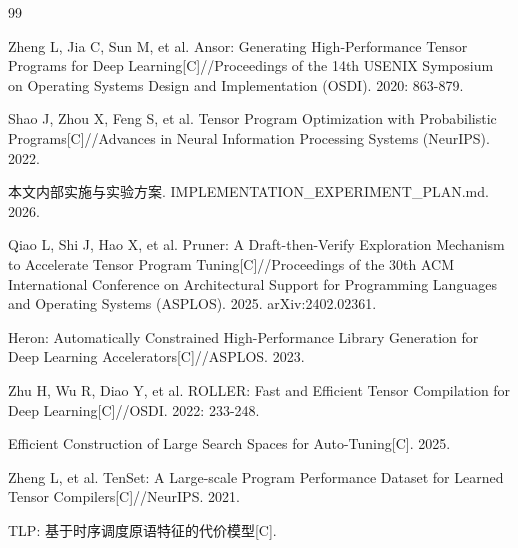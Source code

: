 \documentclass[UTF8]{ctexart}
\begin{document}
\begin{thebibliography}{99}

 Zheng L, Jia C, Sun M, et al. Ansor: Generating High-Performance Tensor Programs for Deep Learning[C]//Proceedings of the 14th USENIX Symposium on Operating Systems Design and Implementation (OSDI). 2020: 863-879.

 Shao J, Zhou X, Feng S, et al. Tensor Program Optimization with Probabilistic Programs[C]//Advances in Neural Information Processing Systems (NeurIPS). 2022.

 本文内部实施与实验方案. IMPLEMENTATION\_EXPERIMENT\_PLAN.md. 2026. %

 Qiao L, Shi J, Hao X, et al. Pruner: A Draft-then-Verify Exploration Mechanism to Accelerate Tensor Program Tuning[C]//Proceedings of the 30th ACM International Conference on Architectural Support for Programming Languages and Operating Systems (ASPLOS). 2025. arXiv:2402.02361.

 Heron: Automatically Constrained High-Performance Library Generation for Deep Learning Accelerators[C]//ASPLOS. 2023. %

 Zhu H, Wu R, Diao Y, et al. ROLLER: Fast and Efficient Tensor Compilation for Deep Learning[C]//OSDI. 2022: 233-248. %

 Efficient Construction of Large Search Spaces for Auto-Tuning[C]. 2025. %

 Zheng L, et al. TenSet: A Large-scale Program Performance Dataset for Learned Tensor Compilers[C]//NeurIPS. 2021. %

 TLP: 基于时序调度原语特征的代价模型[C]. %

\end{thebibliography}
\end{document}
